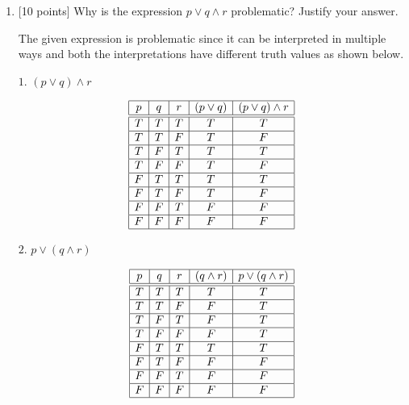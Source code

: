 \documentclass{article}
\begin{document}
\begin{enumerate}
\begin{enumerate}
  \end{enumerate}

\item {[10 points]} Why is the expression $p \lor q \land
  r$ problematic?  Justify your answer.
  
  \begin{answer}
  
  	The given expression is problematic since it can be interpreted in
  	multiple ways and both the interpretations have different truth values as
  	shown below.
  	
  	$1$. $(p \lor q) \land r$
  
  	\begin{displaymath}
  		\begin{array}[t]{|c|c|c|c|c|} \hline
    		p & q & r & (p \lor q) & (p \lor q) \land r \\ \hline\hline
    		T & T & T & T & T \\ \hline
    		T & T & F & T & F \\ \hline
    		T & F & T & T & T \\ \hline
  	 		T & F & F & T & F \\ \hline
  	 		F & T & T & T & T \\ \hline
    		F & T & F & T & F \\ \hline
    		F & F & T & F & F \\ \hline
  	 		F & F & F & F & F \\ \hline
  		\end{array}
  	\end{displaymath}
  	
  	$2$. $p \lor (q \land r)$
  	
  	\begin{displaymath}
  		\begin{array}[t]{|c|c|c|c|c|} \hline
    		p & q & r & (q \land r) & p \lor (q \land r) \\ \hline\hline
    		T & T & T & T & T \\ \hline
    		T & T & F & F & T \\ \hline
    		T & F & T & F & T \\ \hline
  	 		T & F & F & F & T \\ \hline
  	 		F & T & T & T & T \\ \hline
    		F & T & F & F & F \\ \hline
    		F & F & T & F & F \\ \hline
  	 		F & F & F & F & F \\ \hline
  		\end{array}
  	\end{displaymath}
  	

\end{answer}
\end{enumerate}
\end{document}
